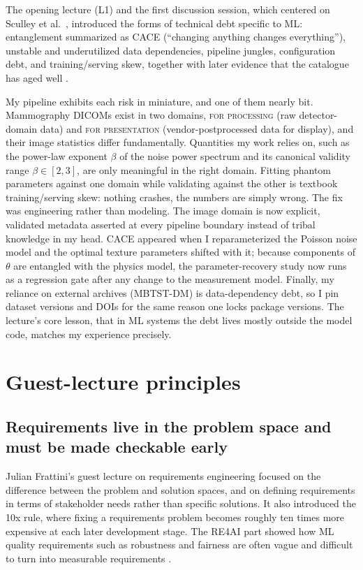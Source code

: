 \documentclass[11pt,a4paper]{article}
\begin{document}
The opening lecture (L1) and the first discussion session, which centered on Sculley et al.\ \cite{sculley}, introduced the forms of technical debt specific to ML: entanglement summarized as CACE (``changing anything changes everything''), unstable and underutilized data dependencies, pipeline jungles, configuration debt, and training/serving skew, together with later evidence that the catalogue has aged well \cite{coursedecks}.

My pipeline exhibits each risk in miniature, and one of them nearly bit. Mammography DICOMs exist in two domains, \textsc{for processing} (raw detector-domain data) and \textsc{for presentation} (vendor-postprocessed data for display), and their image statistics differ fundamentally. Quantities my work relies on, such as the power-law exponent $\beta$ of the noise power spectrum and its canonical validity range $\beta\in[2,3]$, are only meaningful in the right domain. Fitting phantom parameters against one domain while validating against the other is textbook training/serving skew: nothing crashes, the numbers are simply wrong. The fix was engineering rather than modeling. The image domain is now explicit, validated metadata asserted at every pipeline boundary instead of tribal knowledge in my head. CACE appeared when I reparameterized the Poisson noise model and the optimal texture parameters shifted with it; because components of $\theta$ are entangled with the physics model, the parameter-recovery study now runs as a regression gate after any change to the measurement model. Finally, my reliance on external archives (MBTST-DM) is data-dependency debt, so I pin dataset versions and DOIs for the same reason one locks package versions. The lecture's core lesson, that in ML systems the debt lives mostly outside the model code, matches my experience precisely.

\section{Guest-lecture principles}

\subsection{Requirements live in the problem space and must be made checkable early}

Julian Frattini's guest lecture on requirements engineering focused on the difference between the problem and solution spaces, and on defining requirements in terms of stakeholder needs rather than specific solutions. It also introduced the 10x rule, where fixing a requirements problem becomes roughly ten times more expensive at each later development stage. The RE4AI part showed how ML quality requirements such as robustness and fairness are often vague and difficult to turn into measurable requirements \cite{coursedecks}.
\end{document}

